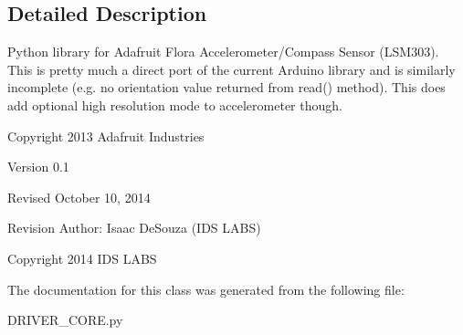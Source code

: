 \subsection{Detailed Description}
\begin{DoxyVerb}Python library for Adafruit Flora Accelerometer/Compass Sensor (LSM303).
This is pretty much a direct port of the current Arduino library and is
similarly incomplete (e.g. no orientation value returned from read()
method).  This does add optional high resolution mode to accelerometer
though.

Copyright 2013 Adafruit Industries

Version 0.1

Revised October 10, 2014

Revision Author: Isaac DeSouza (IDS LABS)

Copyright 2014 IDS LABS
\end{DoxyVerb}
 

The documentation for this class was generated from the following file\+:\begin{DoxyCompactItemize}
\item 
D\+R\+I\+V\+E\+R\+\_\+\+C\+O\+R\+E.\+py\end{DoxyCompactItemize}
